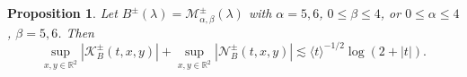 \documentclass[reqno]{amsart}
\newtheorem{proposition}[theorem]{Proposition}
\numberwithin{equation}{section}
\begin{document}
\begin{proposition}\label{third_merged_2} 
	Let $B^\pm(\lambda)=\mathcal{M}_{\alpha,\beta}^{\pm}(\lambda)$ with $\alpha=5,6$, $0\le\beta\le4$, or $0\le\alpha\le4$, $\beta=5,6$. Then
	\[
\sup_{x,y\in\mathbb{R}^2}\left|\mathcal{K}_{B}^\pm(t,x,y)\right|
	+ \sup_{x,y\in\mathbb{R}^2}\left|\mathcal{N}_{B}^\pm(t,x,y)\right|
	\lesssim{\langle t\rangle^{-1/2}} \log(2+|t|).
	\]
\end{proposition}

\end{document}
